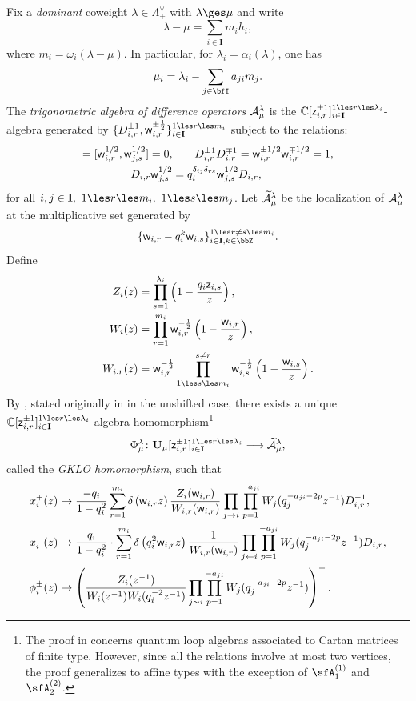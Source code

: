 \documentclass[reqno]{amsart}
\numberwithin{equation}{section}
\begin{document}
Fix a \emph{dominant} coweight $\lambda \in \Lambda^\vee_+$ with $\lambda \ges \mu$ and write 
\[
\lambda - \mu = \sum_{i\in \mathbf{I}} m_i  h_{i}, 
\]
where $m_i = \omega_i(\lambda - \mu)$.
In particular, for $\lambda_i=\alpha_i(\lambda)$, one has
\[
\mu_i=\lambda_i-\sum_{j\in\bfI} a_{ji}m_j.
\] 
The \emph{trigonometric algebra of difference operators} $\mathcal{A}^\lambda_\mu$ is the $\mathbb{C}[\sz_{i,r}^{\pm 1}]_{i \in \mathbf{I}}^{1 \les r \les \lambda_i}$-algebra generated by
$\{D_{i,r}^{\pm 1}, \sw_{i,r}^{\pm \frac12}\}_{i\in \mathbf{I}}^{1\les r\les m_i}$ 
subject to the relations:
\begin{align*}
	[D_{i,r},D_{j,s}]=[\sw^{1/2}_{i,r},\sw^{1/2}_{j,s}]=0,& \qquad 
	D_{i,r}^{\pm 1}D_{i,r}^{\mp 1}=\sw_{i,r}^{\pm 1/2}\sw_{i,r}^{\mp 1/2}=1,\\ 
	D_{i,r}\sw^{1/2}_{j,s} &= q_i^{\delta_{ij}\delta_{rs}}\sw^{1/2}_{j,s}D_{i,r},
\end{align*}
for all $i,j\in \mathbf{I},\ 1\les r\les m_i,\ 1\les s\les m_j$.
Let $\widetilde{\mathcal{A}}^\lambda_\mu$ be the localization of $\mathcal{A}^\lambda_\mu$ at the 
multiplicative set generated by 
$$\{\sw_{i,r}-q_i^k\sw_{i,s}\}_{i\in \mathbf{I}, k\in \bbZ}^{1\les r\ne s\les m_i}.$$ 
Define
\begin{align*}
	Z_i(z) &=\prod_{s=1}^{\lambda_i} \left(1-\frac{q_i \sz_{i,s}}{z}\right), \\ 
	W_i(z) &=\prod_{r=1}^{m_i} \sw_{i,r}^{-\frac12} \left(1-\frac{\sw_{i,r}}{z}\right),\\ 
	W_{i,r}(z) &= \sw_{i,r}^{-\frac12} \prod_{1\les s\les m_i}^{s\ne r} \sw_{i,s}^{-\frac12} 
	\left(1-\frac{\sw_{i,s}}{z}\right).
\end{align*}
By \cite[Thm.~7.1]{FT19}, stated originally in \cite{GKLOq} in the unshifted case, there 
exists a unique $\mathbb{C}[\sz_{i,r}^{\pm 1}]_{i \in \mathbf{I}}^{1 \les r \les 
	\lambda_i}$-algebra homomorphism\footnote{The proof in \cite{FT19} concerns quantum loop algebras associated to Cartan matrices of finite type. However, since all the relations involve at most two vertices, the proof generalizes to affine types with the exception of $\sfA_1^{(1)}$ and $\sfA_2^{(2)}$.}
\begin{equation} \label{eq: GKLO homo}
	{\Phi}^{\lambda}_\mu \colon
	\mathbf{U}_\mu[\sz_{i,r}^{\pm 1}]_{i \in \mathbf{I}}^{1 \les r \les \lambda_i} \longrightarrow \widetilde{\diff}^\lambda_\mu, 
\end{equation}
called the \emph{GKLO homomorphism}, such that
\begin{align*}
	x_i^+(z) &\mapsto \frac{-q_i}{1-q_i^2} 
	\sum_{r=1}^{m_i} \delta\left(\mathsf{w}_{i,r}z\right)\frac{Z_i(\mathsf{w}_{i,r})}{W_{i,r}(\mathsf{w}_{i,r})} \prod_{j\to i} \prod_{p=1}^{-a_{ji}} W_j(q_j^{-a_{ji}-2p}z^{-1})D_{i,r}^{-1}, \\ 
	x_i^-(z) &\mapsto \frac{q_i}{1-q_i^2} \cdot
	\sum_{r=1}^{m_i} \delta\left(q_i^2\mathsf{w}_{i,r}z\right)\frac{1}{W_{i,r}(\mathsf{w}_{i,r})}   \prod_{j\leftarrow i}\prod_{p=1}^{-a_{ji}} W_j(q_j^{-a_{ji}-2p}z^{-1})D_{i,r}, \\ 
	\phi^\pm_i(z) &\mapsto \left(\frac{Z_i(z^{-1})}{W_i(z^{-1})W_i(q_i^{-2}z^{-1})}
	\prod_{j \sim i} \prod_{p=1}^{-a_{ji}} W_j(q_j^{-a_{ji}-2p}z^{-1})\right)^\pm. 
\end{align*}
\end{document}
